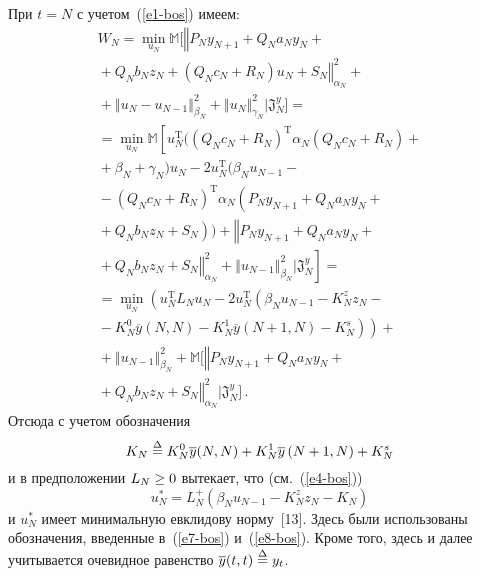 \begin{multicols}{2}
 При $t=N$ с учетом~(\ref{e1-bos}) имеем:
 \begin{multline*}
W_N = \min\limits_{u_N} \mathbb{M}\Big[ \left\Vert P_N y_{N+1} +
Q_N a_N y_N +{}\right.\\
\left.{}+
Q_N b_N z_N +
\left( Q_N c_N + R_N\right) u_N +S_N\right\Vert^2_{\alpha_N} +{}\\
{}+
\left\Vert u_N - u_{N-1}\right\Vert^2_{\beta_N} +
\left\Vert u_N\right\Vert^2_{\gamma_N} \Big\vert \mathfrak{J}_N^y \Big] = {}\\
{}= \min\limits_{u_N} \mathbb{M}
\left[
u_N^{\mathrm{T}} \Big( \left( Q_N c_N + R_N\right)^{\mathrm{T}} \alpha_N
\left( Q_N c_N + R_N\right) +{}\right.\\
{}+
\beta_N + \gamma_N\Big) u_N - 2 u_N^{\mathrm{T}} \Big( \beta_N u_{N-1} -{}\\
{}- \left( Q_N c_N + R_N\right)^{\mathrm{T}} \alpha_N
\left(P_N y_{N+1} + Q_N a_N y_N + {}\right.\\
\left.{}+Q_N b_N z_N + S_N\right)\Big) +
\left\Vert P_N y_{N+1} + Q_N a_N y_N +{}\right.\\
\left.\left.{}+ Q_N b_N z_N
+S_N\right\Vert^2_{\alpha_N} +
\left\Vert u_{N-1} \right\Vert^2_{\beta_N}
\Big\vert
\mathfrak{J}_N^y\right] = {}\\
{} = \min\limits_{u_N}
\left( u_N^{\mathrm{T}} L_N u_N - 2 u_N^{\mathrm{T}} \left(
\beta_N u_{N-1} - K_N^z z_N -{}\right.\right.\\
\left.\left.{}- K_N^0
\overline{y} (N, N) - K_N^1 \overline{y} (N+1, N) - K_N^s\right)\right) +{}\\
{}+ \left\Vert u_{N-1}\right\Vert^2_{\beta_N}
+ \mathbb{M}\Big[ \left\Vert P_N y_{N+1} + Q_N a_N y_N +{}\right.\\
\left.{}+ Q_N b_N z_N +
S_N\right\Vert^2_{\alpha_N}
\Big\vert \mathfrak{J}_N^y \Big]\,.
\end{multline*}
Отсюда с учетом обозначения
$$
K_N\stackrel{\Delta}{=} K_N^0 \overline{y}(N,N)+ K_N^1\overline{y}\left(N+1,N\right)+K_N^s
$$
и в предположении $L_N\hm\geq 0$
вытекает, что  (см.~(\ref{e4-bos}))
$$
u_N^*= L_N^+\left(\beta_N u_{N-1}- K_N^z z_N- K_N\right)
$$
 и $u_N^*$ имеет минимальную евклидову норму~[13].
Здесь были использованы обозначения, введенные
в~(\ref{e7-bos}) и~(\ref{e8-bos}). Кроме того, здесь и далее учитывается
очевидное равенство $\overline{y}(t,t)\stackrel{\Delta}{=} y_t$.


\end{multicols}
